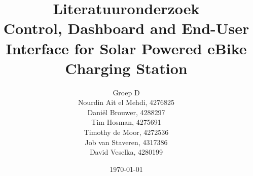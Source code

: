 \documentclass[11pt,a4paper]{article}
\begin{document}
\title{Literatuuronderzoek\\
Control, Dashboard and End-User Interface for Solar Powered eBike Charging Station 
}
\author{Groep D\\
Nourdin Ait el Mehdi, 4276825\\
Dani\"el Brouwer, 4288297\\
Tim Hosman, 4275691\\
Timothy de Moor, 4272536\\
Job van Staveren, 4317386\\
David Veselka, 4280199}
\date{\today}
\clearpage\maketitle
\thispagestyle{empty}

\newpage





\nocite{*}
\begingroup
\raggedright

\endgroup
\end{document}
